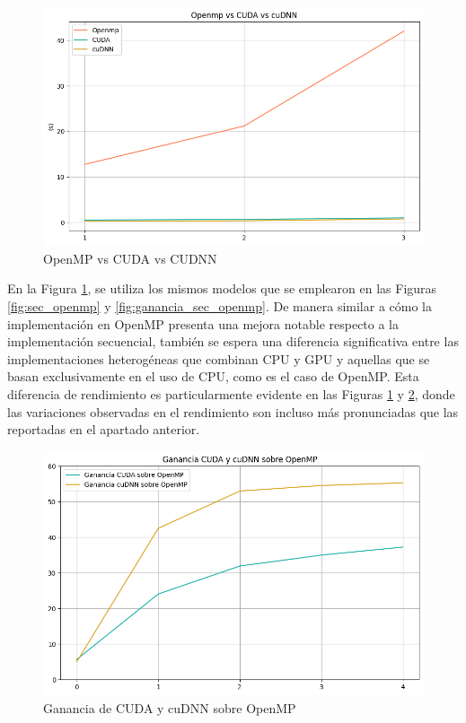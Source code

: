 \begin{figure}[H]
	\centering
	\includegraphics[scale=0.52]{imagenes/openmp_cuda_cudnn.png}  
	\caption{OpenMP vs CUDA vs CUDNN}
	\label{fig:openmp_cuda_cudnn}
\end{figure}

En la Figura \ref{fig:openmp_cuda_cudnn}, se utiliza los mismos modelos que se emplearon en las Figuras \ref{fig:sec_openmp} y \ref{fig:ganancia_sec_openmp}.
De manera similar a cómo la implementación en OpenMP presenta una mejora notable respecto a la implementación secuencial, también se espera una diferencia significativa entre las implementaciones heterogéneas que combinan CPU y GPU  y aquellas que se basan exclusivamente en el uso de CPU, como es el caso de OpenMP. Esta diferencia de rendimiento es particularmente evidente en las Figuras \ref{fig:openmp_cuda_cudnn} y \ref{fig:ganancia_cuda_cudnn_openmp}, donde las variaciones observadas en el rendimiento son incluso más pronunciadas que las reportadas en el apartado anterior.

\begin{figure}[H]
	\centering
	\includegraphics[scale=0.5]{imagenes/ganancia_cuda_cudnn_openmp.png}  
	\caption{Ganancia de CUDA y cuDNN sobre OpenMP}
	\label{fig:ganancia_cuda_cudnn_openmp}
\end{figure}

